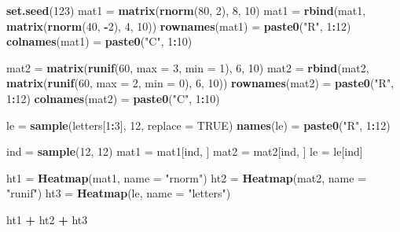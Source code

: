 \documentclass[]{book}
\newenvironment{Shaded}{\begin{snugshade}}{\end{snugshade}}
\newcommand{\KeywordTok}[1]{\textcolor[rgb]{0.13,0.29,0.53}{\textbf{#1}}}
\newcommand{\DataTypeTok}[1]{\textcolor[rgb]{0.13,0.29,0.53}{#1}}
\newcommand{\DecValTok}[1]{\textcolor[rgb]{0.00,0.00,0.81}{#1}}
\newcommand{\StringTok}[1]{\textcolor[rgb]{0.31,0.60,0.02}{#1}}
\newcommand{\OtherTok}[1]{\textcolor[rgb]{0.56,0.35,0.01}{#1}}
\newcommand{\OperatorTok}[1]{\textcolor[rgb]{0.81,0.36,0.00}{\textbf{#1}}}
\newcommand{\NormalTok}[1]{#1}
\theoremstyle{definition}
\theoremstyle{definition}
\theoremstyle{definition}
\theoremstyle{remark}
\begin{document}
\begin{Shaded}
\begin{Highlighting}[]
\KeywordTok{set.seed}\NormalTok{(}\DecValTok{123}\NormalTok{)}
\NormalTok{mat1 =}\StringTok{ }\KeywordTok{matrix}\NormalTok{(}\KeywordTok{rnorm}\NormalTok{(}\DecValTok{80}\NormalTok{, }\DecValTok{2}\NormalTok{), }\DecValTok{8}\NormalTok{, }\DecValTok{10}\NormalTok{)}
\NormalTok{mat1 =}\StringTok{ }\KeywordTok{rbind}\NormalTok{(mat1, }\KeywordTok{matrix}\NormalTok{(}\KeywordTok{rnorm}\NormalTok{(}\DecValTok{40}\NormalTok{, }\OperatorTok{-}\DecValTok{2}\NormalTok{), }\DecValTok{4}\NormalTok{, }\DecValTok{10}\NormalTok{))}
\KeywordTok{rownames}\NormalTok{(mat1) =}\StringTok{ }\KeywordTok{paste0}\NormalTok{(}\StringTok{"R"}\NormalTok{, }\DecValTok{1}\OperatorTok{:}\DecValTok{12}\NormalTok{)}
\KeywordTok{colnames}\NormalTok{(mat1) =}\StringTok{ }\KeywordTok{paste0}\NormalTok{(}\StringTok{"C"}\NormalTok{, }\DecValTok{1}\OperatorTok{:}\DecValTok{10}\NormalTok{)}

\NormalTok{mat2 =}\StringTok{ }\KeywordTok{matrix}\NormalTok{(}\KeywordTok{runif}\NormalTok{(}\DecValTok{60}\NormalTok{, }\DataTypeTok{max =} \DecValTok{3}\NormalTok{, }\DataTypeTok{min =} \DecValTok{1}\NormalTok{), }\DecValTok{6}\NormalTok{, }\DecValTok{10}\NormalTok{)}
\NormalTok{mat2 =}\StringTok{ }\KeywordTok{rbind}\NormalTok{(mat2, }\KeywordTok{matrix}\NormalTok{(}\KeywordTok{runif}\NormalTok{(}\DecValTok{60}\NormalTok{, }\DataTypeTok{max =} \DecValTok{2}\NormalTok{, }\DataTypeTok{min =} \DecValTok{0}\NormalTok{), }\DecValTok{6}\NormalTok{, }\DecValTok{10}\NormalTok{))}
\KeywordTok{rownames}\NormalTok{(mat2) =}\StringTok{ }\KeywordTok{paste0}\NormalTok{(}\StringTok{"R"}\NormalTok{, }\DecValTok{1}\OperatorTok{:}\DecValTok{12}\NormalTok{)}
\KeywordTok{colnames}\NormalTok{(mat2) =}\StringTok{ }\KeywordTok{paste0}\NormalTok{(}\StringTok{"C"}\NormalTok{, }\DecValTok{1}\OperatorTok{:}\DecValTok{10}\NormalTok{)}

\NormalTok{le =}\StringTok{ }\KeywordTok{sample}\NormalTok{(letters[}\DecValTok{1}\OperatorTok{:}\DecValTok{3}\NormalTok{], }\DecValTok{12}\NormalTok{, }\DataTypeTok{replace =} \OtherTok{TRUE}\NormalTok{)}
\KeywordTok{names}\NormalTok{(le) =}\StringTok{ }\KeywordTok{paste0}\NormalTok{(}\StringTok{"R"}\NormalTok{, }\DecValTok{1}\OperatorTok{:}\DecValTok{12}\NormalTok{)}

\NormalTok{ind =}\StringTok{ }\KeywordTok{sample}\NormalTok{(}\DecValTok{12}\NormalTok{, }\DecValTok{12}\NormalTok{)}
\NormalTok{mat1 =}\StringTok{ }\NormalTok{mat1[ind, ]}
\NormalTok{mat2 =}\StringTok{ }\NormalTok{mat2[ind, ]}
\NormalTok{le =}\StringTok{ }\NormalTok{le[ind]}

\NormalTok{ht1 =}\StringTok{ }\KeywordTok{Heatmap}\NormalTok{(mat1, }\DataTypeTok{name =} \StringTok{"rnorm"}\NormalTok{)}
\NormalTok{ht2 =}\StringTok{ }\KeywordTok{Heatmap}\NormalTok{(mat2, }\DataTypeTok{name =} \StringTok{"runif"}\NormalTok{)}
\NormalTok{ht3 =}\StringTok{ }\KeywordTok{Heatmap}\NormalTok{(le, }\DataTypeTok{name =} \StringTok{"letters"}\NormalTok{)}

\NormalTok{ht1 }\OperatorTok{+}\StringTok{ }\NormalTok{ht2 }\OperatorTok{+}\StringTok{ }\NormalTok{ht3}
\end{Highlighting}
\end{Shaded}
\end{document}
